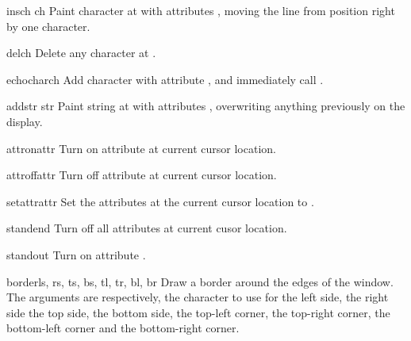 \begin{methoddesc}{insch}{ ch}
Paint character  at  with attributes
, moving the line from position  right by one
character.
\end{methoddesc}

\begin{methoddesc}{delch}{}
Delete any character at .
\end{methoddesc}

\begin{methoddesc}{echochar}{ch}
Add character  with attribute , and immediately 
call .
\end{methoddesc}

\begin{methoddesc}{addstr}{ str}
Paint string  at  with attributes , overwriting
anything previously on the display.
\end{methoddesc}

\begin{methoddesc}{attron}{attr}
Turn on attribute  at current cursor location.
\end{methoddesc}

\begin{methoddesc}{attroff}{attr}
Turn off attribute  at current cursor location.
\end{methoddesc}

\begin{methoddesc}{setattr}{attr}
Set the attributes at the current cursor location to .
\end{methoddesc}

\begin{methoddesc}{standend}{}
Turn off all attributes at current cusor location.
\end{methoddesc}

\begin{methoddesc}{standout}{}
Turn on attribute .
\end{methoddesc}

\begin{methoddesc}{border}{ls, rs, 
                           ts, bs, 
                           tl, tr, 
                           bl, br}
Draw a border around the edges of the window. The arguments are
respectively, the character to use for the left side, the right side
the top side, the bottom side, the top-left corner, the top-right
corner, the bottom-left corner and the bottom-right corner.
\end{methoddesc}

